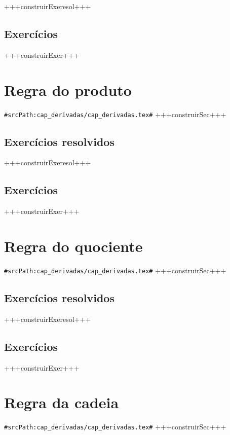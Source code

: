 +++construirExeresol+++


\subsection*{Exercícios}

+++construirExer+++


\section{Regra do produto}
\verb+#srcPath:cap_derivadas/cap_derivadas.tex#+
+++construirSec+++

\subsection*{Exercícios resolvidos}

+++construirExeresol+++


\subsection*{Exercícios}

+++construirExer+++


\section{Regra do quociente}
\verb+#srcPath:cap_derivadas/cap_derivadas.tex#+
+++construirSec+++

\subsection*{Exercícios resolvidos}

+++construirExeresol+++


\subsection*{Exercícios}

+++construirExer+++


\section{Regra da cadeia}
\verb+#srcPath:cap_derivadas/cap_derivadas.tex#+
+++construirSec+++

